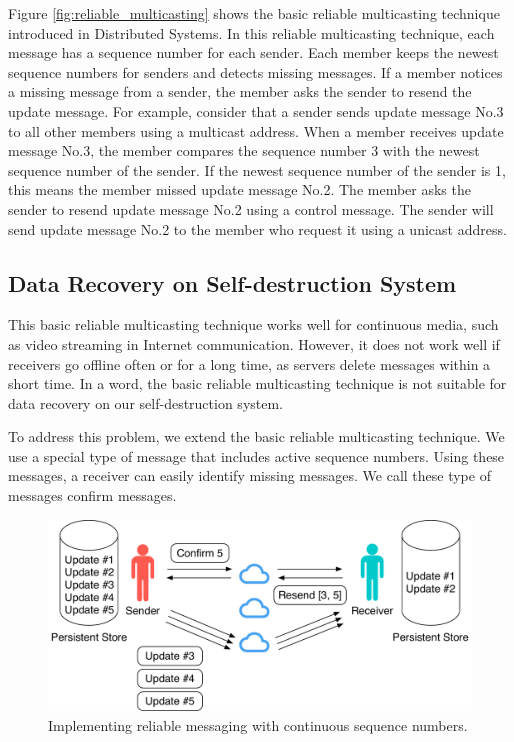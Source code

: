 \documentclass[a4paper,11pt]{report}
\begin{document}
Figure \ref{fig:reliable_multicasting} shows the basic reliable multicasting technique introduced in Distributed Systems\cite{tanenbaum2007distributed}.
In this reliable multicasting technique, each message has a sequence number for each sender.
Each member keeps the newest sequence numbers for senders and detects missing messages.
If a member notices a missing message from a sender, the member asks the sender to resend the update message.
For example, consider that a sender sends update message No.3 to all other members using a multicast address.
When a member receives update message No.3, the member compares the sequence number 3 with the newest sequence number of the sender.
If the newest sequence number of the sender is 1, this means the member missed update message No.2.
The member asks the sender to resend update message No.2 using a control message.
The sender will send update message No.2 to the member who request it using a unicast address.

\subsection{Data Recovery on Self-destruction System}
This basic reliable multicasting technique works well for continuous media, such as video streaming in Internet communication.
However, it does not work well if receivers go offline often or for a long time, as servers delete messages within a short time.
In a word, the basic reliable multicasting technique is not suitable for data recovery on our self-destruction system.

To address this problem, we extend the basic reliable multicasting technique.
We use a special type of message that includes active sequence numbers.
Using these messages, a receiver can easily identify missing messages.
We call these type of messages confirm messages.

\begin{figure}[t]
	\centering
	\includegraphics[scale=0.6]{reliable_sync}
	\caption{Implementing reliable messaging with continuous sequence numbers.}
	\label{fig:reliable_messaging}
\end{figure}
\end{document}
